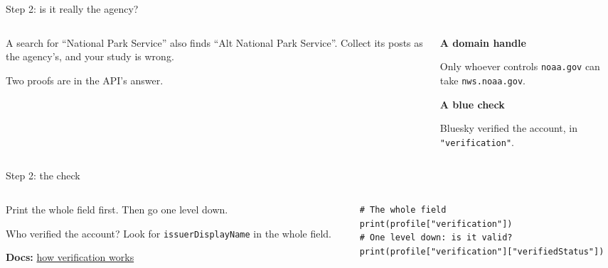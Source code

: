 \documentclass[9pt,aspectratio=169]{beamer}
\begin{document}
\begin{frame}{Step 2: is it really the agency?}
    \begin{columns}[T]
        \begin{column}{0.6\textwidth}
            A search for ``National Park Service'' also finds ``Alt National Park Service''. Collect its posts as the agency's, and your study is wrong.

            \medskip
            Two proofs are in the API's answer.
        \end{column}
        \begin{column}{0.35\textwidth}
            \textbf{A domain handle}\\[2pt]
            {\footnotesize Only whoever controls \texttt{noaa.gov} can take \texttt{nws.noaa.gov}.\par}
            \medskip
            \textbf{A blue check}\\[2pt]
            {\footnotesize Bluesky verified the account, in \texttt{"verification"}.\par}
        \end{column}
    \end{columns}
\end{frame}

\begin{frame}[fragile]{Step 2: the check}
    \begin{columns}[T]
        \begin{column}{0.37\textwidth}
            Print the whole field first. Then go one level down.

            \medskip
            Who verified the account? Look for \texttt{issuerDisplayName} in the whole field.

            \medskip
            {\scriptsize\textbf{Docs:} \href{https://bsky.social/about/blog/04-21-2025-verification}{how verification works}\par}
        \end{column}
        \begin{column}{0.6\textwidth}
\begin{lstlisting}
# The whole field
print(profile["verification"])
# One level down: is it valid?
print(profile["verification"]["verifiedStatus"])
\end{lstlisting}
        \end{column}
    \end{columns}
\end{frame}
\end{document}
